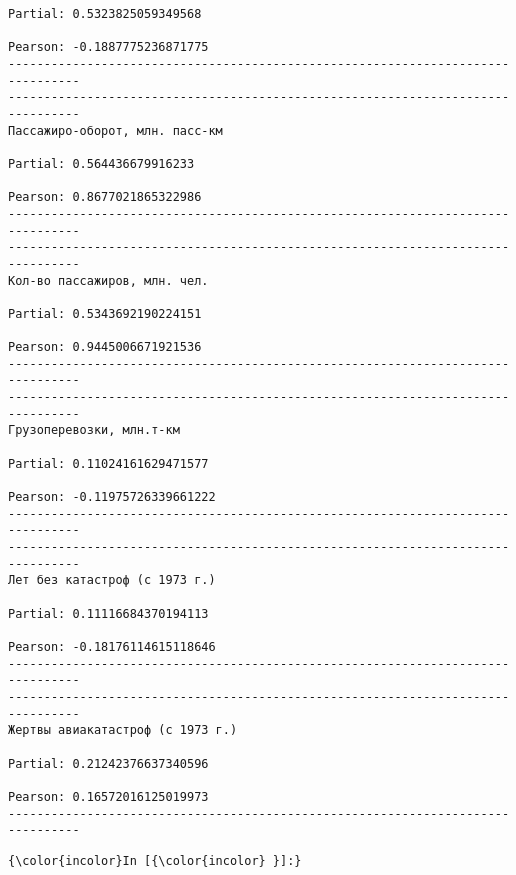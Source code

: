 \documentclass[11pt,mathletters]{article}
\begin{document}
\begin{Verbatim}[commandchars=\\\{\}]
Partial: 0.5323825059349568

Pearson: -0.1887775236871775
--------------------------------------------------------------------------------
--------------------------------------------------------------------------------
Пассажиро-оборот, млн. пасс-км

Partial: 0.564436679916233

Pearson: 0.8677021865322986
--------------------------------------------------------------------------------
--------------------------------------------------------------------------------
Кол-во пассажиров, млн. чел. 

Partial: 0.5343692190224151

Pearson: 0.9445006671921536
--------------------------------------------------------------------------------
--------------------------------------------------------------------------------
Грузоперевозки, млн.т-км

Partial: 0.11024161629471577

Pearson: -0.11975726339661222
--------------------------------------------------------------------------------
--------------------------------------------------------------------------------
Лет без катастроф (с 1973 г.)

Partial: 0.11116684370194113

Pearson: -0.18176114615118646
--------------------------------------------------------------------------------
--------------------------------------------------------------------------------
Жертвы авиакатастроф (с 1973 г.)

Partial: 0.21242376637340596

Pearson: 0.16572016125019973
--------------------------------------------------------------------------------

    \end{Verbatim}

    \begin{Verbatim}[commandchars=\\\{\}]
{\color{incolor}In [{\color{incolor} }]:} 
\end{Verbatim}


    
    
    
    
\end{document}
